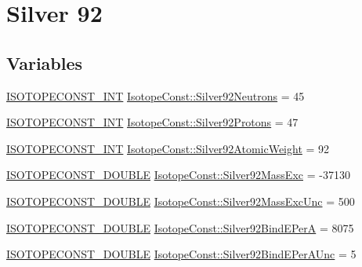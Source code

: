 \hypertarget{group___isotope_const-_silver-_ag92}{}\section{Silver 92}
\label{group___isotope_const-_silver-_ag92}
\subsection*{Variables}
\begin{DoxyCompactItemize}
\item 
\mbox{\hyperlink{group___isotope_const-_macros_ga5f18360b3e99483a35c32d789e62621c}{I\+S\+O\+T\+O\+P\+E\+C\+O\+N\+S\+T\+\_\+\+I\+NT}} \mbox{\hyperlink{group___isotope_const-_silver-_ag92_ga974abe7f28b8a3e3806d9ccebf78e8b6}{Isotope\+Const\+::\+Silver92\+Neutrons}} = 45
\item 
\mbox{\hyperlink{group___isotope_const-_macros_ga5f18360b3e99483a35c32d789e62621c}{I\+S\+O\+T\+O\+P\+E\+C\+O\+N\+S\+T\+\_\+\+I\+NT}} \mbox{\hyperlink{group___isotope_const-_silver-_ag92_gaa9c700e79ccc202692b96ed9ccc3058a}{Isotope\+Const\+::\+Silver92\+Protons}} = 47
\item 
\mbox{\hyperlink{group___isotope_const-_macros_ga5f18360b3e99483a35c32d789e62621c}{I\+S\+O\+T\+O\+P\+E\+C\+O\+N\+S\+T\+\_\+\+I\+NT}} \mbox{\hyperlink{group___isotope_const-_silver-_ag92_gae501fe37834ecfb6f69042815abe3e1b}{Isotope\+Const\+::\+Silver92\+Atomic\+Weight}} = 92
\item 
\mbox{\hyperlink{group___isotope_const-_macros_ga8f45a7272ce02c0b4c65c44636ed719a}{I\+S\+O\+T\+O\+P\+E\+C\+O\+N\+S\+T\+\_\+\+D\+O\+U\+B\+LE}} \mbox{\hyperlink{group___isotope_const-_silver-_ag92_ga8f42afbd7dbcec1ed8760d89ba3544e4}{Isotope\+Const\+::\+Silver92\+Mass\+Exc}} = -\/37130
\item 
\mbox{\hyperlink{group___isotope_const-_macros_ga8f45a7272ce02c0b4c65c44636ed719a}{I\+S\+O\+T\+O\+P\+E\+C\+O\+N\+S\+T\+\_\+\+D\+O\+U\+B\+LE}} \mbox{\hyperlink{group___isotope_const-_silver-_ag92_ga11260f2ce12b207c0b65259012f80c1a}{Isotope\+Const\+::\+Silver92\+Mass\+Exc\+Unc}} = 500
\item 
\mbox{\hyperlink{group___isotope_const-_macros_ga8f45a7272ce02c0b4c65c44636ed719a}{I\+S\+O\+T\+O\+P\+E\+C\+O\+N\+S\+T\+\_\+\+D\+O\+U\+B\+LE}} \mbox{\hyperlink{group___isotope_const-_silver-_ag92_gab6b2c53c52cf293415bc78b9f214c967}{Isotope\+Const\+::\+Silver92\+Bind\+E\+PerA}} = 8075
\item 
\mbox{\hyperlink{group___isotope_const-_macros_ga8f45a7272ce02c0b4c65c44636ed719a}{I\+S\+O\+T\+O\+P\+E\+C\+O\+N\+S\+T\+\_\+\+D\+O\+U\+B\+LE}} \mbox{\hyperlink{group___isotope_const-_silver-_ag92_ga44f2547a3675e69c0fb6cded063d67ab}{Isotope\+Const\+::\+Silver92\+Bind\+E\+Per\+A\+Unc}} = 5

\end{DoxyCompactItemize}
